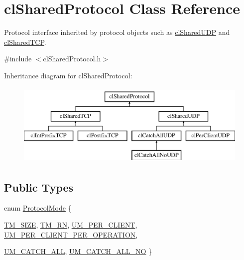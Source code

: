 \hypertarget{classcl_shared_protocol}{
\section{clSharedProtocol Class Reference}
\label{classcl_shared_protocol}
}


Protocol interface inherited by protocol objects such as \hyperlink{classcl_shared_u_d_p}{clSharedUDP} and \hyperlink{classcl_shared_t_c_p}{clSharedTCP}.  




{\ttfamily \#include $<$clSharedProtocol.h$>$}

Inheritance diagram for clSharedProtocol:\begin{figure}[H]
\begin{center}
\leavevmode
\includegraphics[height=4.000000cm]{classcl_shared_protocol}
\end{center}
\end{figure}
\subsection*{Public Types}
\begin{DoxyCompactItemize}
\item 
enum \hyperlink{classcl_shared_protocol_a4b0b9c82b8ae4eee78c6308c35afd47b}{ProtocolMode} \{ \par
\hyperlink{classcl_shared_protocol_a4b0b9c82b8ae4eee78c6308c35afd47ba9f62bd1b819b8a5d53e6f0b679495c61}{TM\_\-SIZE}, 
\hyperlink{classcl_shared_protocol_a4b0b9c82b8ae4eee78c6308c35afd47ba399adc08f122d7c09a83610197d24666}{TM\_\-RN}, 
\hyperlink{classcl_shared_protocol_a4b0b9c82b8ae4eee78c6308c35afd47babacdf5be8acea89eddc85f01f7b74018}{UM\_\-PER\_\-CLIENT}, 
\hyperlink{classcl_shared_protocol_a4b0b9c82b8ae4eee78c6308c35afd47ba85523bd746d838b1620e0c4fc3da392e}{UM\_\-PER\_\-CLIENT\_\-PER\_\-OPERATION}, 
\par
\hyperlink{classcl_shared_protocol_a4b0b9c82b8ae4eee78c6308c35afd47ba5315dd28370f0e13b26603c1b0a17c21}{UM\_\-CATCH\_\-ALL}, 
\hyperlink{classcl_shared_protocol_a4b0b9c82b8ae4eee78c6308c35afd47ba5780629b78f91735d369000983ce955e}{UM\_\-CATCH\_\-ALL\_\-NO}
 \}
\end{DoxyCompactItemize}
